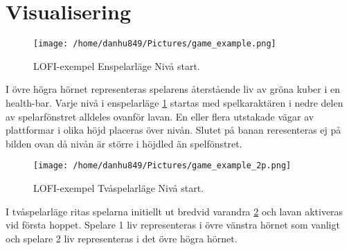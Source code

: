 \documentclass{TDP005mall}
\begin{document}
\newpage
\section{Visualisering}%

\begin{figure}[h!]
  \caption{LOFI-exempel Enspelarläge Nivå start.\label{fig:7}}
  \centerline{\texttt{[image: /home/danhu849/Pictures/game\_example.png]}}  
\end{figure}

I övre högra hörnet representeras spelarens återstående liv av gröna kuber i en health-bar. Varje nivå i enspelarläge \ref{fig:7} startas med spelkaraktären i nedre delen av spelarfönstret alldeles ovanför lavan. En eller flera utstakade vägar av plattformar i olika höjd placeras över nivån. Slutet på banan reresenteras ej på bilden ovan då nivån är större i höjdled än spelfönstret.

\newpage
\begin{figure}[h!]
  \caption{LOFI-exempel Tvåspelarläge Nivå start.\label{fig:8}}
  \centerline{\texttt{[image: /home/danhu849/Pictures/game\_example\_2p.png]}}  
\end{figure}
I tvåspelarläge ritas spelarna initiellt ut bredvid varandra \ref{fig:8} och lavan aktiveras vid första hoppet. Spelare 1 liv representeras i övre vänstra hörnet som vanligt och spelare 2 liv representeras i det övre högra hörnet.
\end{document}
